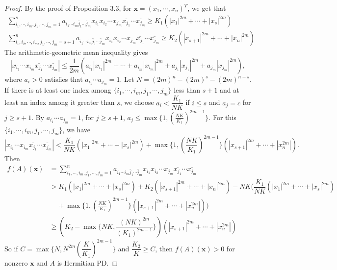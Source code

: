 \documentclass[10pt,reqno]{amsart}
\theoremstyle{definition}
\begin{document}
\begin{proof}
By the proof of Proposition 3.3, for $\mathbf{x}=(x_1,\cdots, x_n)^T$, we get that \begin{align*}
\sum_{i_1,\cdots, i_m, j_1, \cdots, j_m=1}^s a_{i_1\cdots i_m\bar{j}_1\cdots \bar{j}_m} x_{i_1} x_{i_2}\cdots x_{j_m}\overline{x_{j_1}}\cdots\overline{x_{j_m}}\geq K_1(|x_1|^{2m}+\cdots+|x_s|^{2m})\\
\sum_{i_1, i_2,\cdots, i_m, j_1, \cdots, j_m=s+1}^n a_{i_1\cdots i_m\bar{j}_1\cdots \bar{j}_m} x_{i_1} x_{i_2}\cdots x_{j_m}\overline{x_{j_1}}\cdots\overline{x_{j_m}}\geq K_2(|x_{s+1}|^{2m}+\cdots+|x_n|^{2m})
\end{align*}
The arithmetic-geometric mean inequality gives $$|x_{i_1}\cdots x_{i_m}\overline{x_{j_1}}\cdots\overline{x_{j_m}}|\leq \dfrac{1}{2m}(a_{i_1}|x_{i_1}|^{2m}+\cdots+a_{i_m}|x_{i_m}|^{2m}+a_{j_1}|x_{j_1}|^{2m}+a_{j_m}|x_{j_m}|^{2m}),$$ where $a_i>0$ satisfies that $a_{i_1}\cdots a_{j_m}=1$. Let $N=(2m)^{n}-(2m)^s-(2m)^{n-s}$. If there is at least one index among $\{i_1,\cdots, i_m, j_1, \cdots, j_m\}$ less than $s+1$ and at least an index among it greater than $s$, we choose $a_i<\dfrac{K_1}{NK}$ if $i\leq s$ and $a_j=c$ for $j\geq s+1$. By $a_{i_1}\cdots a_{j_m}=1$, for $j\geq s+1$, $a_j\leq \max\{1,(\frac{NK}{K_1})^{2m-1}\}$. For this $\{i_1,\cdots, i_m, j_1, \cdots, j_m\}$, we have $$|x_{i_1}\cdots x_{i_m}\overline{x_{j_1}}\cdots\overline{x_{j_m}}|< \dfrac{K_1}{NK}(|x_{1}|^{2m}+\cdots+|x_{s}|^{2m})+\max\{1,(\frac{NK}{K_1})^{2m-1}\}(|x_{s+1}|^{2m}+\cdots+|x_{n}^{2m}|).$$
Then 
\begin{align*}
f(A)(\mathbf{x})&=\sum_{i_1,\cdots, i_m, j_1, \cdots, j_m=1}^n a_{i_1\cdots i_m\bar{j}_1\cdots \bar{j}_m} x_{i_1} x_{i_2}\cdots x_{j_m}\overline{x_{j_1}}\cdots\overline{x_{j_m}}\\
&> K_1(|x_1|^{2m}+\cdots+|x_s|^{2m})+K_2(|x_{s+1}|^{2m}+\cdots+|x_n|^{2m})-NK(\dfrac{K_1}{NK}(|x_{1}|^{2m}+\cdots+|x_{s}|^{2m})\\
& \ \ \ \ \ +\max\{1,(\frac{NK}{K_1})^{2m-1}\}(|x_{s+1}|^{2m}+\cdots+|x_{n}^{2m}|))\\
&\geq (K_2-\max\{NK,\dfrac{(NK)^{2m}}{(K_1)^{2m-1}}\})(|x_{s+1}|^{2m}+\cdots+|x_{n}^{2m}|)
\end{align*}
So if $C=\max\{N,N^{2m}(\dfrac{K}{K_1})^{2m-1}\}$ and $\dfrac{K_2}{K}\geq C$, then $f(A)(\mathbf{x})> 0$ for nonzero $\mathbf{x}$ and $A$ is Hermitian PD.
 \end{proof}
\end{document}
